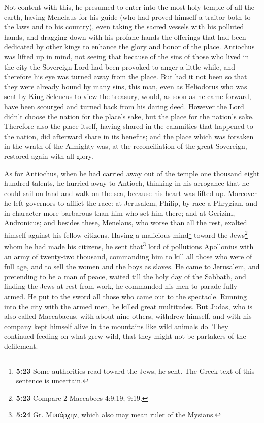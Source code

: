  Not content with this, he presumed to enter into the
most holy temple of all the earth, having Menelaus for his guide (who
had proved himself a traitor both to the laws and to his country),
 even taking the sacred vessels with his polluted hands,
and dragging down with his profane hands the offerings that had been
dedicated by other kings to enhance the glory and honor of the place.
 Antiochus was lifted up in mind, not seeing that because
of the sins of those who lived in the city the Sovereign Lord had been
provoked to anger a little while, and therefore his eye was turned away
from the place.  But had it not been so that they were
already bound by many sins, this man, even as Heliodorus who was sent by
King Seleucus to view the treasury, would, as soon as he came forward,
have been scourged and turned back from his daring deed. 
However the Lord didn't choose the nation for the place's sake, but the
place for the nation's sake.  Therefore also the place
itself, having shared in the calamities that happened to the nation, did
afterward share in its benefits; and the place which was forsaken in the
wrath of the Almighty was, at the reconciliation of the great Sovereign,
restored again with all glory.

 As for Antiochus, when he had carried away out of the
temple one thousand eight hundred talents, he hurried away to Antioch,
thinking in his arrogance that he could sail on land and walk on the
sea, because his heart was lifted up.  Moreover he left
governors to afflict the race: at Jerusalem, Philip, by race a Phrygian,
and in character more barbarous than him who set him there;
 and at Gerizim, Andronicus; and besides these, Menelaus,
who worse than all the rest, exalted himself against his
fellow-citizens. Having a malicious mind\footnote{\textbf{5:23} Some
  authorities read toward the Jews, he sent. The Greek text of this
  sentence is uncertain.} toward the Jews\footnote{\textbf{5:23} Compare
  2 Maccabees 4:9:19; 9:19.} whom he had made his citizens,
 he sent that\footnote{\textbf{5:24} Gr. Μυσάρχην, which
  also may mean ruler of the Mysians.} lord of pollutions Apollonius
with an army of twenty-two thousand, commanding him to kill all those
who were of full age, and to sell the women and the boys as slaves.
 He came to Jerusalem, and pretending to be a man of
peace, waited till the holy day of the Sabbath, and finding the Jews at
rest from work, he commanded his men to parade fully armed.
 He put to the sword all those who came out to the
spectacle. Running into the city with the armed men, he killed great
multitudes.  But Judas, who is also called Maccabaeus,
with about nine others, withdrew himself, and with his company kept
himself alive in the mountains like wild animals do. They continued
feeding on what grew wild, that they might not be partakers of the
defilement.

